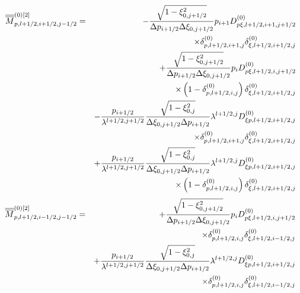 \begin{eqnarray}
\overline{\overline{M}}_{p,l+1/2,i+1/2,j-1/2}^{\left( 0\right) \left[ 2%
\right] } &=&-\frac{\sqrt{1-\xi _{0,j+1/2}^{2}}}{\Delta p_{i+1/2}\Delta \xi
_{0,j+1/2}}p_{i+1}D_{p\xi ,l+1/2,i+1,j+1/2}^{\left( 0\right) }  \notag \\
&&\times \delta _{p,l+1/2,i+1,j}^{\left( 0\right) }\delta _{\xi
,l+1/2,i+1/2,j}^{\left( 0\right) }  \notag \\
&&+\frac{\sqrt{1-\xi _{0,j+1/2}^{2}}}{\Delta p_{i+1/2}\Delta \xi _{0,j+1/2}}%
p_{i}D_{p\xi ,l+1/2,i,j+1/2}^{\left( 0\right) }  \notag \\
&&\times \left( 1-\delta _{p,l+1/2,i,j}^{\left( 0\right) }\right) \delta
_{\xi ,l+1/2,i+1/2,j}^{\left( 0\right) }  \notag \\
&&-\frac{p_{i+1/2}}{\lambda ^{l+1/2,j+1/2}}\frac{\sqrt{1-\xi _{0,j}^{2}}}{%
\Delta \xi _{0,j+1/2}\Delta p_{i+1/2}}\lambda ^{l+1/2,j}D_{\xi
p,l+1/2,i+1/2,j}^{\left( 0\right) }  \notag \\
&&\times \delta _{p,l+1/2,i+1,j}^{\left( 0\right) }\delta _{\xi
,l+1/2,i+1/2,j}^{\left( 0\right) }  \notag \\
&&+\frac{p_{i+1/2}}{\lambda ^{l+1/2,j+1/2}}\frac{\sqrt{1-\xi _{0,j}^{2}}}{%
\Delta \xi _{0,j+1/2}\Delta p_{i+1/2}}\lambda ^{l+1/2,j}D_{\xi
p,l+1/2,i+1/2,j}^{\left( 0\right) }  \notag \\
&&\times \left( 1-\delta _{p,l+1/2,i,j}^{\left( 0\right) }\right) \delta
_{\xi ,l+1/2,i+1/2,j}^{\left( 0\right) }
\end{eqnarray}%
\begin{eqnarray}
\overline{\overline{M}}_{p,l+1/2,i-1/2,j-1/2}^{\left( 0\right) \left[ 2%
\right] } &=&+\frac{\sqrt{1-\xi _{0,j+1/2}^{2}}}{\Delta p_{i+1/2}\Delta \xi
_{0,j+1/2}}p_{i}D_{p\xi ,l+1/2,i,j+1/2}^{\left( 0\right) }  \notag \\
&&\times \delta _{p,l+1/2,i,j}^{\left( 0\right) }\delta _{\xi
,l+1/2,i-1/2,j}^{\left( 0\right) }  \notag \\
&&+\frac{p_{i+1/2}}{\lambda ^{l+1/2,j+1/2}}\frac{\sqrt{1-\xi _{0,j}^{2}}}{%
\Delta \xi _{0,j+1/2}\Delta p_{i+1/2}}\lambda ^{l+1/2,j}D_{\xi
p,l+1/2,i+1/2,j}^{\left( 0\right) }  \notag \\
&&\times \delta _{p,l+1/2,i,j}^{\left( 0\right) }\delta _{\xi
,l+1/2,i-1/2,j}^{\left( 0\right) }
\end{eqnarray}

